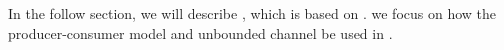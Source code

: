 







In the follow section, we will describe \myds, 
which is based on \myth.
we focus on how the producer-consumer model and unbounded channel be used in \myds.








